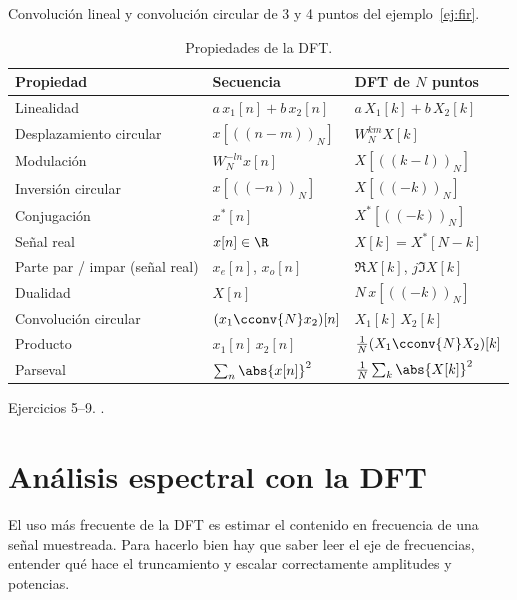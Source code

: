 \documentclass[11pt,a4paper]{scrartcl}
\begin{document}
\begin{encodigo}
  Convolución lineal y convolución circular de 3 y 4 puntos del ejemplo~\ref{ej:fir}.
\end{encodigo}

\begin{table}[ht]
  \centering
  \renewcommand{\arraystretch}{1.25}
  \begin{tabular}{@{}lll@{}}
    \toprule
    Propiedad & Secuencia & DFT de $N$ puntos\\\midrule
    Linealidad & $a\,x_1[n]+b\,x_2[n]$ & $a\,X_1[k]+b\,X_2[k]$\\
    Desplazamiento circular & $x[((n-m))_N]$ & $W_N^{km}X[k]$\\
    Modulación & $W_N^{-ln}x[n]$ & $X[((k-l))_N]$\\
    Inversión circular & $x[((-n))_N]$ & $X[((-k))_N]$\\
    Conjugación & $x^*[n]$ & $X^*[((-k))_N]$\\
    Señal real & $x[n]\in\R$ & $X[k]=X^*[N-k]$\\
    Parte par / impar (señal real) & $x_e[n]$, $x_o[n]$ & $\Re X[k]$, $j\Im X[k]$\\
    Dualidad & $X[n]$ & $N\,x[((-k))_N]$\\
    Convolución circular & $(x_1\cconv{N}x_2)[n]$ & $X_1[k]\,X_2[k]$\\
    Producto & $x_1[n]\,x_2[n]$ & $\frac1N(X_1\cconv{N}X_2)[k]$\\
    Parseval & $\sum_n\abs{x[n]}^2$ & $\frac1N\sum_k\abs{X[k]}^2$\\\bottomrule
  \end{tabular}
  \caption{Propiedades de la DFT.}
  \label{tab:propiedades}
\end{table}

\begin{flushright}\small\color{pdsgris}Ejercicios 5–9. .\end{flushright}

\section{Análisis espectral con la DFT}\label{sec:espectral}

El uso más frecuente de la DFT es estimar el contenido en frecuencia de una señal muestreada. Para hacerlo bien hay que saber leer el eje de frecuencias, entender qué hace el truncamiento y escalar correctamente amplitudes y potencias.
\end{document}
